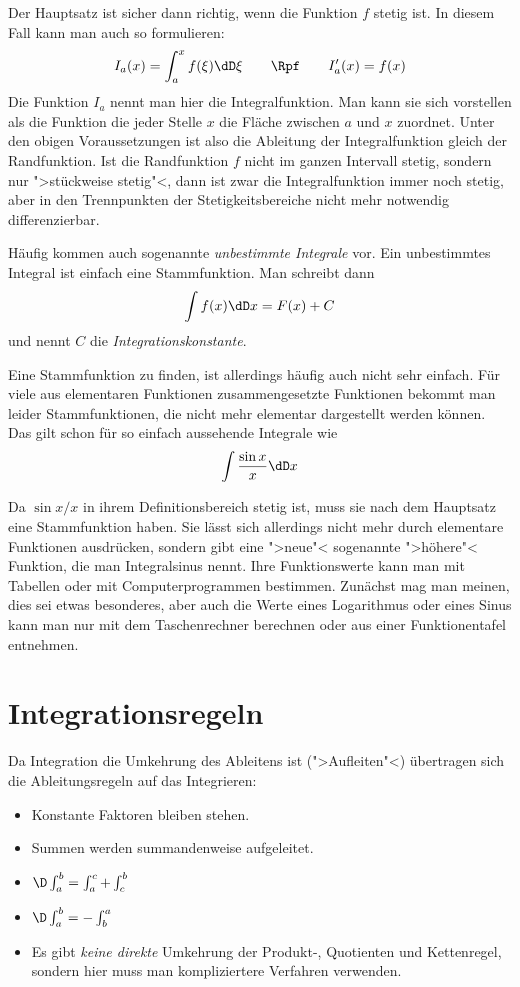 Der Hauptsatz ist sicher dann richtig, wenn die Funktion $f$ stetig ist.
In diesem Fall kann man auch so formulieren:
\[
I_a(x)=\int_a^x f(\xi)\dD \xi \qquad\Rpf\qquad I_a'(x)=f(x)
\]
Die Funktion $I_a$ nennt man hier die Integralfunktion. Man kann sie sich
vorstellen als die Funktion die jeder Stelle $x$ die Fläche zwischen $a$ und
$x$ zuordnet. Unter den obigen Voraussetzungen ist also die Ableitung der
Integralfunktion gleich der Randfunktion. Ist die Randfunktion $f$ nicht im
ganzen Intervall stetig, sondern nur ">stückweise stetig"<, dann ist zwar die
Integralfunktion immer noch stetig, aber in den Trennpunkten der
Stetigkeitsbereiche nicht mehr notwendig differenzierbar.

Häufig kommen auch sogenannte \emph{unbestimmte Integrale} vor. Ein
unbestimmtes Integral ist einfach eine Stammfunktion. Man schreibt dann
\[
\int f(x)\dD x= F(x)+C
\]
und nennt $C$ die \emph{Integrationskonstante}.

Eine Stammfunktion zu finden, ist allerdings häufig auch nicht sehr einfach.
Für viele aus elementaren Funktionen zusammengesetzte Funktionen bekommt man
leider Stammfunktionen, die nicht mehr elementar dargestellt werden können. Das gilt
schon für so einfach aussehende Integrale wie
\[
\int \frac{\sin x}{x}\dD x
\]

Da $\sin x /x$ in ihrem Definitionsbereich stetig ist, muss sie nach dem
Hauptsatz eine Stammfunktion haben. Sie lässt sich allerdings nicht mehr durch
elementare Funktionen ausdrücken, sondern gibt eine ">neue"< sogenannte
">höhere"< Funktion, die man Integralsinus nennt. Ihre Funktionswerte kann man
mit Tabellen oder mit Computerprogrammen bestimmen. Zunächst mag man meinen,
dies sei etwas besonderes, aber auch die Werte eines Logarithmus oder eines
Sinus kann man nur mit dem Taschenrechner berechnen oder aus einer
Funktionentafel entnehmen.

\section{Integrationsregeln}

Da Integration die Umkehrung des Ableitens ist (">Aufleiten"<) übertragen sich
die Ableitungsregeln auf das Integrieren:
\begin{itemize}
\item Konstante Faktoren bleiben stehen.
\item Summen werden summandenweise aufgeleitet.
\item $\D\int_a^b=\int_a^c+\int_c^b$
\item $\D \int_a^b=-\int_b^a$
\item Es gibt \emph{keine direkte} Umkehrung der Produkt-, Quotienten und
  Kettenregel, sondern hier muss man kompliziertere Verfahren verwenden.
\end{itemize}

